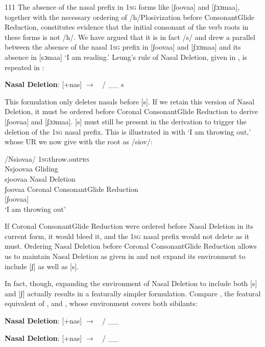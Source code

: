 \documentclass[output=paper]{langsci/langscibook}
\begin{document}
\begin{tabular}{111}
The absence of the nasal prefix in 1\textsc{sg} forms like [ʃoovaa] and [ʃɔɔmaa], together with the necessary ordering of /h/Plosivization before ConsonantGlide Reduction, constitutes evidence that the initial consonant of the verb roots in these forms is not /h/. We have argued that it is in fact /s/ and drew a parallel between the absence of the nasal 1\textsc{sg} prefix in [ʃoovaa] and [ʃɔɔmaa] and its absence in [sɔmaa] ‘I am reading.’ Leung’s rule of Nasal Deletion, given in , is repeated in :

\ea{}
 \textbf{Nasal Deletion}: [+nas] $\rightarrow$  / \_\_ s\\{}
\z

This formulation only deletes nasals before [s]. If we retain this version of Nasal Deletion, it must be ordered before Coronal ConsonantGlide Reduction to derive [ʃoovaa] and [ʃɔɔmaa]. [s] must still be present in the derivation to trigger the deletion of the 1\textsc{sg} nasal prefix. This is illustrated in  with ‘I am throwing out,’ whose UR we now give with the root as /siov/:

\ea{}
 /Nsiovaa/  \textsc{1sg}throw.out\textsc{prs}\\{}
Nsjoovaa  Gliding\\{}
sjoovaa   Nasal Deletion\\{}
ʃoovaa  Coronal ConsonantGlide Reduction\\{}
[ʃoovaa] \\{}
\glt  ‘I am throwing out’
\z

If Coronal ConsonantGlide Reduction were ordered before Nasal Deletion in its current form, it would bleed it, and the 1\textsc{sg} nasal prefix would not delete as it must. Ordering Nasal Deletion before Coronal ConsonantGlide Reduction allows us to maintain Nasal Deletion as given in  and not expand its environment to include [ʃ] as well as [s]. 

In fact, though, expanding the environment of Nasal Deletion to include both [s] and [ʃ] actually results in a featurally simpler formulation. Compare , the featural equivalent of , and , whose environment covers both sibilants:

\ea{}
 \textbf{Nasal Deletion}: [+nas] $\rightarrow$  / \_\_ \\{}
\z

\ea{}
 \textbf{Nasal Deletion}: [+nas] $\rightarrow$  / \_\_ \\{}
\z




\end{tabular}
\end{document}
